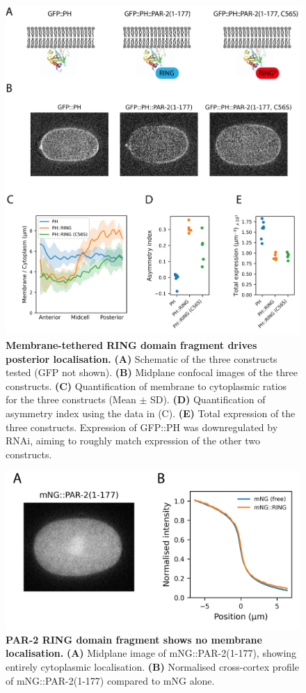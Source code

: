 \documentclass[12pt]{"report"}
\newcommand{\mycaption}[2]{\caption[#1]{\textbf{#1.} #2}}
\begin{document}
\begin{figure}[!h]
\includegraphics[scale=1]{ph_ring}
\setlength{\abovecaptionskip}{20pt}
\centering
\mycaption{Membrane-tethered RING domain fragment drives posterior localisation}{
\textbf{(A)} Schematic of the three constructs tested (GFP not shown).
\textbf{(B)} Midplane confocal images of the three constructs.
\textbf{(C)} Quantification of membrane to cytoplasmic ratios for the three constructs (Mean $\pm$ SD).
\textbf{(D)} Quantification of asymmetry index using the data in (C).
\textbf{(E)} Total expression of the three constructs. Expression of GFP::PH was downregulated by RNAi, aiming to roughly match expression of the other two constructs.
}
\label{fig:ph_ring}
\end{figure}

\begin{figure}
\includegraphics[scale=1]{ring_fragment_in_vivo}
\centering
\mycaption{PAR-2 RING domain fragment shows no membrane localisation}{
\textbf{(A)} Midplane image of mNG::PAR-2(1-177), showing entirely cytoplasmic localisation.
\textbf{(B)} Normalised cross-cortex profile of mNG::PAR-2(1-177) compared to mNG alone.
}
\label{fig:ring_fragment_in_vivo}
\end{figure}
\end{document}
